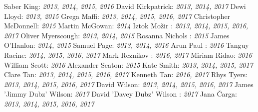 \begin{fullwidth}
\begin{multicols}{2}
\newline
Saber King: \textsl{2013, 2014, 2015, 2016 }
\newline
David Kirkpatrick: \textsl{2013, 2014, 2017 }
\newline
Dewi Lloyd: \textsl{2013, 2015 }
\newline
Grega Maffi: \textsl{2013, 2014, 2015, 2016, 2017 }
\newline
Christopher McDonnell: \textsl{2015 }
\newline
Martin McGowan: \textsl{2014 }
\newline
Iztok Mo\v{z}ir : \textsl{2013, 2014, 2015, 2016, 2017 }
\newline
Oliver Myerscough: \textsl{2013, 2014, 2015 }
\newline
Rosanna Nichols : \textsl{2015 }
\newline
James O'Hanlon: \textsl{2014, 2015 }
\newline
Samuel Page: \textsl{2013, 2014, 2016 }
\newline
Arun Paul : \textsl{2016 }
\newline
Tanguy Racine: \textsl{2014, 2015, 2016, 2017 }
\newline
Mark Reznikov : \textsl{2016, 2017 }
\newline
Miriam Ridao: \textsl{2016 }
\newline
William Scott: \textsl{2016 }
\newline
Alexander Seaton: \textsl{2015 }
\newline
Kate Smith: \textsl{2013, 2014, 2015, 2017 }
\newline
Clare Tan: \textsl{2013, 2014, 2015, 2016, 2017 }
\newline
Kenneth Tan: \textsl{2016, 2017 }
\newline
Rhys Tyers: \textsl{2013, 2014, 2015, 2016, 2017 }
\newline
David Wilson: \textsl{2013, 2014, 2015, 2016, 2017 }
\newline
James 'Jimmy Dubz' Wilson: \textsl{2017 }
\newline
David 'Davey Dubz' Wilson : \textsl{2017 }
\newline
Jana \v{C}arga: \textsl{2013, 2014, 2015, 2016, 2017 }
\newline
\end{multicols} \end{fullwidth} 
